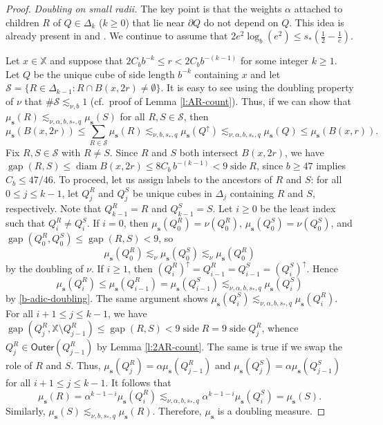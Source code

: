 \documentclass[12pt]{amsart}
\theoremstyle{definition}
\theoremstyle{remark}
\newcommand{\XX}{\mathbb{X}}
\newcommand{\diam}{\mathop\mathrm{diam}\nolimits}
\newcommand{\side}{\mathop\mathrm{side}\nolimits}
\newcommand{\gap}{\mathop\mathrm{gap}\nolimits}
\newcommand{\muse}{\mu_{\mathbf{s}}}
\newcommand{\Outer}{\mathsf{Outer}}
\numberwithin{figure}{section}
\numberwithin{equation}{section}
\begin{document}
\begin{proof}
\emph{Doubling on small radii.} The key point is that the weights $\alpha$ attached to children $R$ of $Q\in\Delta_k$ ($k\geq 0$) that lie near $\partial Q$ do not depend on $Q$. This idea is already present in \cite[\S3]{KRS-cubes} and \cite[\S8]{BLZ}. We continue to assume that $2e^2\log_b(e^2)\leq s_*(\tfrac12-\tfrac{1}{e})$.

Let $x\in\XX$ and suppose that $2C_b b^{-k}\leq r< 2C_b b^{-(k-1)}$ for some integer $k\geq 1$. Let $Q$ be the unique cube of side length $b^{-k}$ containing $x$ and let $\mathcal{S}=\{R\in\Delta_{k-1}:R\cap B(x,2r)\neq\emptyset\}$. It is easy to see using the doubling property of $\nu$ that $\#\mathcal{S}\lesssim_{\nu,b} 1$ (cf.~proof of Lemma \ref{l:AR-count}). Thus, if we can show that $\muse(R)\lesssim_{\nu,\alpha,b,s_*,q} \muse(S)$ for all $R,S\in\mathcal{S}$, then $$\muse(B(x,2r))\leq \sum_{R\in\mathcal{S}} \muse(R) \lesssim_{\nu,b,s_*,q}\muse(Q^\uparrow) \lesssim_{\nu,\alpha,b,s_*,q}\muse(Q)\leq  \muse(B(x,r)).$$ Fix $R,S\in\mathcal{S}$ with $R\neq S$. Since $R$ and $S$ both intersect $B(x,2r)$, we have $\gap(R,S)\leq \diam B(x,2r)\leq 8C_b\, b^{-(k-1)}< 9\side R$, since $b\geq 47$ implies $C_b\leq 47/46$. To proceed, let us assign labels to the ancestors of $R$ and $S$: for all $0\leq j\leq k-1$, let $Q^R_j$ and $Q^S_j$ be unique cubes in $\Delta_j$ containing $R$ and $S$, respectively. Note that $Q^R_{k-1}=R$ and $Q^S_{k-1}=S$. Let $i\geq 0$ be the least index such that $Q^R_i\neq Q^S_i$. If $i=0$, then $\muse(Q^R_0)=\nu(Q^R_0)$, $\muse(Q^S_0)=\nu(Q^S_0)$, and $\gap(Q^R_0,Q^S_0)\leq \gap(R,S)<9$, so \begin{equation}\label{0-doubling}\muse(Q^R_0)\lesssim_\nu \muse(Q^S_0)\lesssim_{\nu}\muse(Q^R_0)\end{equation} by the doubling of $\nu$. If $i\geq 1$, then $(Q^R_i)^\uparrow = Q^R_{i-1}=Q^S_{i-1}=(Q^S_i)^\uparrow$. Hence \begin{equation}\label{1-doubling}
\muse(Q^R_i)\leq \muse(Q^R_{i-1})=\muse(Q^S_{i-1})\lesssim_{\nu,\alpha,b,s_*,q}\muse(Q^S_{i})\end{equation} by \eqref{b-adic-doubling}. The same argument shows $\muse(Q^S_i)\lesssim_{\nu,\alpha,b,s_*,q}\muse(Q^R_i)$. For all $i+1\leq j\leq k-1$, we have $\gap(Q^R_j,\XX \setminus Q^R_{j-1})\leq \gap(R,S)<9 \side R= 9\side Q^R_j$, whence $Q^R_j\in\Outer(Q^R_{j-1})$ by Lemma \ref{l:2AR-count}. The same is true if we swap the role of $R$ and $S$. Thus, $\muse(Q^R_j)=\alpha\muse(Q^R_{j-1})$ and $\muse(Q^S_j)=\alpha\muse(Q^S_{j-1})$ for all $i+1\leq j\leq k-1$. It follows that \begin{equation} \muse(R)=\alpha^{k-1-i} \muse(Q^R_i) \lesssim_{\nu,\alpha,b,s_*,q} \alpha^{k-1-i} \muse(Q^S_i)=\muse(S).\end{equation} Similarly, $\muse(S)\lesssim_{\nu,b,s_*,q}\muse(R)$. Therefore, $\muse$ is a doubling measure.
\end{proof}
\end{document}

